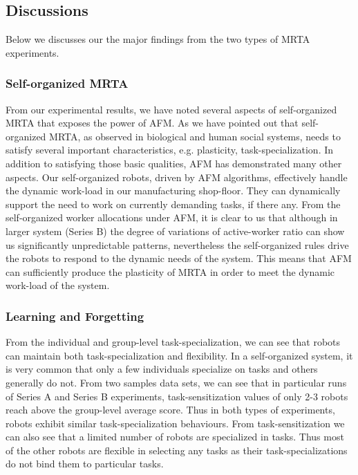 \documentclass[smallcondensed]{svjour3}
\begin{document}
\subsection{Discussions}
\label{afm:discuss}
Below we discusses our the major findings from the two types of MRTA experiments.
\subsubsection{Self-organized MRTA}
From our experimental results, we have noted several aspects of self-organized MRTA that exposes the power of AFM. As we have pointed out that self-organized MRTA, as observed in biological and human social systems, needs to satisfy several important characteristics, e.g. plasticity, task-specialization. In addition to satisfying those basic qualities, AFM has demonstrated many other aspects. Our self-organized robots, driven by AFM algorithms, effectively handle the dynamic work-load in our manufacturing shop-floor. They can dynamically support the need to work on currently demanding tasks, if there any. From the self-organized worker allocations under AFM, it is clear to us that although in larger system (Series B) the degree of variations of active-worker ratio can show us significantly unpredictable patterns, nevertheless the self-organized rules drive the robots to respond to the dynamic needs of the system. This means that AFM can sufficiently produce the plasticity of MRTA in order to meet the dynamic work-load of the system.
\subsubsection{Learning and Forgetting}
From the individual and group-level task-specialization, we can see that robots can maintain both task-specialization and flexibility. In a self-organized system, it is very common that only a few individuals specialize on tasks and others generally do not. From two samples data sets, we can see that in particular runs of Series A and Series B experiments, task-sensitization values of  only 2-3 robots reach above the group-level average score. Thus in both types of experiments, robots exhibit similar task-specialization behaviours. From task-sensitization we can also see that a limited number of robots are specialized in tasks. Thus most of the other robots are flexible in selecting any tasks as their task-specializations do not bind them to particular tasks.
\end{document}
